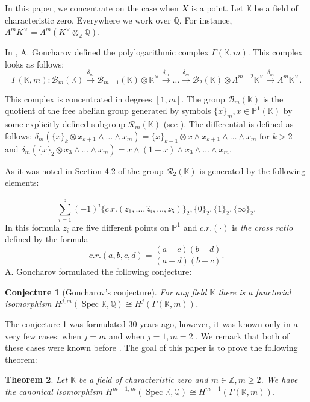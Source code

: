\documentclass[12pt]{extarticle}
\newtheorem{theorem}{Theorem}[section]
\newtheorem{conjecture}[theorem]{Conjecture}
\def\mb{\mathbb}
\def\mc{\mathcal}
\def\k{\mb K}
\def\Z{\mb Z}
\def\Q{\mb Q}
\def\wdw{\wedge\dots\wedge}
\DeclareMathOperator{\spec}{Spec}
\begin{document}
In this paper, we concentrate on the case when $X$ is a point. Let $\k$ be a field of characteristic zero. Everywhere we work over $\Q$. For instance, $\Lambda^m K^\times=\Lambda^m (K^\times\otimes_\Z\Q)$. 

In \cite{goncharov1995geometry}, A. Goncharov defined the polylogarithmic complex $\Gamma(\k,m)$. This complex looks as follows:
$$\Gamma(\k,m)\colon \mathcal B_m(\k)\xrightarrow{\delta_m} \mathcal B_{m-1}(\k)\otimes \k^\times\xrightarrow{\delta_m}\dots\xrightarrow{\delta_m}\mathcal B_2(\k)\otimes \Lambda^{m-2}\k^\times\xrightarrow{\delta_m}\Lambda^m \k^\times.$$

This complex is concentrated in degrees $[1,m]$. The group $\mathcal B_m(\k)$ is the quotient of the free abelian group generated by symbols $\{x\}_m, x\in \mathbb P^1(\k)$ by some explicitly defined subgroup $\mathcal R_m(\k)$ (see \cite{goncharov1994polylogarithms}).   The differential is defined as follows: $\delta_m(\{x\}_k\otimes x_{k+1}\wedge \dots \wedge x_m)=\{x\}_{k-1}\otimes x\wedge x_{k+1}\wedge \dots \wedge x_m$ for $k>2$ and $\delta_m(\{x\}_2\otimes x_3\wdw x_m)=x\wedge (1-x)\wedge x_3\wdw x_m$.

 As it was noted in Section 4.2 of \cite{goncharov1994polylogarithms} the group $\mc R_2(\k)$  is generated by the following elements:

$$\sum\limits_{i=1}^5(-1)^i\{c.r.(z_1,\dots, \widehat z_i,\dots, z_5)\}_2, \{0\}_2, \{1\}_2, \{\infty\}_2.$$
  In this formula $z_i$ are five different points on $\mathbb P^1$ and $c.r.(\cdot)$ is \emph{the cross ratio} defined by the formula $$c.r.(a,b,c,d)=\dfrac{(a-c)(b-d)}{(a-d)(b-c)}. $$ A. Goncharov formulated the following conjecture:

  \begin{conjecture}[Goncharov's conjecture]
  \label{conj:Goncharov_K_theory}
      For any field $\k$ there is a functorial isomorphism $H^{j,m}(\spec\k,\Q)\cong H^j(\Gamma(\k,m))$. 
  \end{conjecture}

  The conjecture \ref{conj:Goncharov_K_theory} was formulated  30 years ago, however, it was known only in a very few cases: when $j=m$ \cite{totaro_1992_milnork,nesterenko1990homology} and when $j=1, m=2$ \cite{suslin1991k3}. We remark that both of these cases were known before \cite{goncharov1995geometry}. The goal of this paper is to prove the following theorem:

  \begin{theorem}
\label{th:main_first_intro}
      Let $\k$ be a field of characteristic zero and $m\in\Z, m\geq 2$. We have the canonical isomorphism $H^{m-1,m}(\spec\k,\Q)\cong H^{m-1}(\Gamma(\k,m))$.
  \end{theorem}
\end{document}
